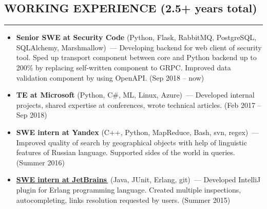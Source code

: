 \documentclass[11pt]{res} %
\let\orighref\href
\renewcommand{\href}[2]{\orighref{#1}{#2\,\faExternalLink}}
\begin{document}
\begin{resume}
\section{\uppercase{Working Experience} (2.5+ years total)}
\begin{spacing}{0.3}
\textcolor[RGB]{220,220,220}{\rule{\linewidth}{0.4pt}} 
\end{spacing}
\vspace{0.2in}
   \begin{itemize} \itemsep -2pt  %
   \item {\textbf{Senior SWE at Security Code}} (Python, Flask, RabbitMQ, PostgreSQL, SQLAlchemy, Marshmallow)~--- Developing backend for web client of security tool. Sped up transport component between core and Python backend up to 200\% by replacing self-written component to GRPC. Improved data validation component by using OpenAPI. (Sep 2018 – now)
   \item {\textbf{TE at Microsoft}} (Python, C\#, ML, Linux, Azure)~--- Developed internal projects, shared expertise at conferences, wrote technical articles. (Feb 2017 – Sep 2018)
   \item {\textbf{SWE intern at Yandex}} (C++, Python, MapReduce, Bash, svn, regex)~--- Improved quality of search by geographical objects with help of linguistic features of Russian language. Supported sides of the world in queries. (Summer 2016)
   \item \textbf{\href{https://github.com/ignatov/intellij-erlang/commits?author=telezhnaya}{SWE intern at JetBrains}} (Java, JUnit, Erlang, git)~--- Developed IntelliJ plugin for Erlang programming language. Created multiple inspections, autocompleting, links resolution requested by users. (Summer 2015)
 \end{itemize}


\end{resume}
\end{document}
